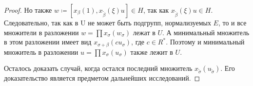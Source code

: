\documentclass[15pt]{article}
\theoremstyle{remark}
\begin{document}
\begin{proof}
Но также $ w \coloneqq [x_\beta(1), x_{\widetilde{\beta}}(\xi)u] \in H$, так как $x_{\widetilde{\beta}}(\xi)u \in H$. Следовательно, так как в U не может быть подгрупп, нормализуемых $E$, то и все множители в разложении $w = \prod x_\sigma(w_\sigma)$ лежат в $U$. А минимальный множитель в этом разложении имеет вид $x_{\sigma+\beta}(c u_\sigma)$, где $c \in R^*$. Поэтому и минимальный множитель в разложении $u = \prod x_\sigma(u_\sigma)$ также лежит в $U$.

Осталось доказать случай, когда остался последний множитель $x_{\widetilde{\sigma}}(u_{\widetilde{\sigma}})$. Его доказательство является предметом дальнейших исследований.


\end{proof}



\end{document}
